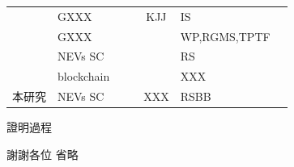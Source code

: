 \documentclass[
    writingLanguage=chinese, %
    addPageTitle=on,  %
    addDeclaration=on, %
    addMUSTlog=on, %
    addFigTOC=on, %
    addTabTOC=on, %
    refIndent=off, %
    printMod=off, %
]{must}
\begin{document}
\begin{table}
\begin{tabular}{p{7cm}m{3cm}cccll}
            \citeauthor{rae1905}             
                & GXXX             &  \icon{\Checkmark}              &  \icon{\Checkmark}         &KJJ              & IS             
                &\citeyear{rae1905}\\
                
            \citeauthor{rae1905}              
                & GXXX             & \icon{\Checkmark}           & \icon{\XSolidBrush}             & \icon{\XSolidBrush}             & WP,RGMS,TPTF             
                &\citeyear{Brown2013}\\
                
            \citeauthor{rae1905}
                & NEVs SC             & \icon{\Checkmark}              & \icon{\XSolidBrush}             & \icon{\XSolidBrush}             & RS                        
                &\citeyear{Hossain2013}\\

\citeauthor{rae1905} & blockchain  & \icon{\XSolidBrush}   & \icon{\XSolidBrush}   & \icon{\XSolidBrush}   & XXX& \citeyear{rae1905}  \\ 
本研究      & NEVs SC     & \icon{\Checkmark}   & \icon{\Checkmark}       & XXX   & RSBB\\

        \bottomrule
    \end{tabular}
\end{table}







\begin{appendix}
證明過程
\end{appendix}


\begin{acknowpage}
謝謝各位 
省略
\end{acknowpage}



\begin{addcvpage}




\end{addcvpage}
\end{document}
